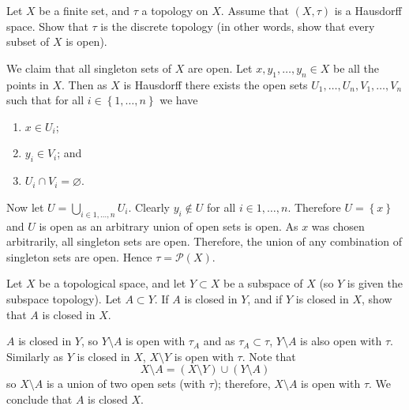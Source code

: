 \documentclass[a4paper, answers]{exam}
\begin{document}
\begin{questions}
	\question
		Let $X$ be a finite set, and $\tau$ a topology on $X$.
		Assume that $(X, \tau)$ is a Hausdorff space.
		Show that $\tau$ is the discrete topology
		(in other words,
		show that every subset of $X$ is open).
	\begin{solution}
		We claim that all singleton sets of $X$ are open.
		Let $x, y_1, \ldots, y_n \in X$ be all the points in $X$.
		Then as $X$ is Hausdorff there exists the open sets
		$U_1, \ldots, U_n, V_1, \ldots, V_n$ such that for all
		$i \in \left\{ 1, \ldots, n \right\}$ we have
		\begin{enumerate}
			\item $x \in U_i$;
			\item $y_i \in V_i$; and
			\item $U_i \cap V_i = \varnothing$.
		\end{enumerate}
		Now let $U = \bigcup_{i \in {1,\ldots,n}} U_i$.
		Clearly $y_i \not\in U$ for all $i \in {1, \ldots, n}$.
		Therefore $U = \left\{ x \right\}$ and $U$ is open
		as an arbitrary union of open sets is open.
		As $x$ was chosen arbitrarily, all singleton sets are open.
		Therefore, the union of any combination of singleton sets are open.
		Hence $\tau = \mathcal P(X)$.
	\end{solution}
	

	\question
		Let $X$ be a topological space, 
		and let $Y \subset X$ be a subspace of $X$
		(so $Y$ is given the subspace topology).
		Let $A \subset Y$.
		If $A$ is closed in $Y$, and if $Y$ is closed in $X$,
		show that $A$ is closed in $X$.

	\begin{solution}
		$A$ is closed in $Y$,
		so $Y \setminus  A$ is open with $\tau_A$
		and as $\tau_A \subset \tau$, $Y \setminus A$ is
		also open with $\tau$.
		Similarly as $Y$ is closed in $X$, 
		$X \setminus Y$ is open with $\tau$.
		Note that \[
			X \setminus A = (X \setminus Y) \cup (Y \setminus A)
		\]
		so $X \setminus A$ is a union of two open sets (with $\tau$);
		therefore, $X \setminus A$ is open with $\tau$.
		We conclude that $A$ is closed $X$.
	\end{solution}
\end{questions}
\end{document}
